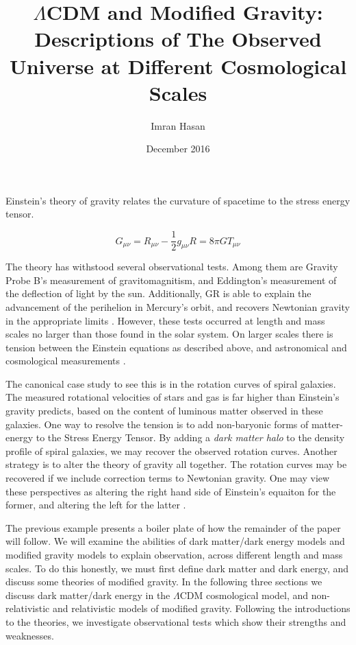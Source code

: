 \documentclass[12pt]{article}
\begin{document}
\title{$\Lambda$CDM and Modified Gravity: Descriptions of The Observed Universe at Different Cosmological Scales}
\author{Imran Hasan}
\date{December 2016}
\maketitle


Einstein's theory of gravity relates the curvature of spacetime to the stress energy tensor.

$$G_{\mu\nu} = R_{\mu \nu} - \frac{1}{2} g_{\mu \nu} R = 8\pi GT_{\mu \nu}$$

The theory has withstood several observational tests. Among them are Gravity Probe B's measurement of gravitomagnitism, and Eddington's measurement of the deflection of light by the sun. Additionally, GR is able to explain the advancement of the perihelion in Mercury's orbit, and recovers Newtonian gravity in the appropriate limits \cite{Caroll2004}. However, these tests occurred at length and mass scales no larger than those found in the solar system. On larger scales there is tension between the Einstein equations as described above, and astronomical and cosmological measurements \cite{Mavromatos2009}.

The canonical case study to see this is in the rotation curves of spiral galaxies. The measured rotational velocities of stars and gas is far higher than Einstein's gravity predicts, based on the content of luminous matter observed in these galaxies. One way to resolve the tension is to add non-baryonic forms of matter-energy to the Stress Energy Tensor. By adding a \emph{dark matter halo} to the density profile of spiral galaxies, we may recover the observed rotation curves. Another strategy is to alter the theory of gravity all together. The rotation curves may be recovered if we include correction terms to Newtonian gravity. One may view these perspectives as altering the right hand side of Einstein's equaiton for the former, and altering the left for the latter \cite{Bertone2004}. 

The previous example presents a boiler plate of how the remainder of the paper will follow. We will examine the abilities of dark matter/dark energy models and modified gravity models to explain observation, across different length and mass scales. To do this honestly, we must first define dark matter and dark energy, and discuss some theories of modified gravity. In the following three sections we discuss dark matter/dark energy in the $\Lambda$CDM cosmological model, and non-relativistic and relativistic models of modified gravity. Following the introductions to the theories, we investigate observational tests which show their strengths and weaknesses.
\end{document}

